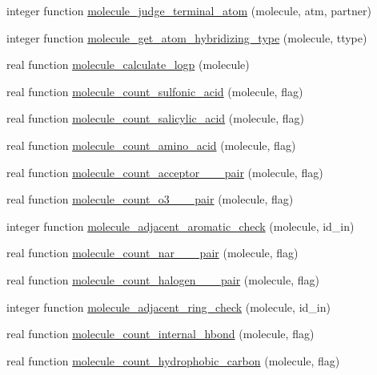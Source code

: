 \begin{DoxyCompactItemize}
\item 
integer function \hyperlink{classcalc__xscore_afcdd1c67bf78c0192ffdc8326f826f41}{molecule\-\_\-judge\-\_\-terminal\-\_\-atom} (molecule, atm, partner)
\item 
integer function \hyperlink{classcalc__xscore_a2519395561372b91576ddc91f217ea0a}{molecule\-\_\-get\-\_\-atom\-\_\-hybridizing\-\_\-type} (molecule, ttype)
\item 
real function \hyperlink{classcalc__xscore_a1468c0b615c6c387ceebe6e51cd9eb14}{molecule\-\_\-calculate\-\_\-logp} (molecule)
\item 
real function \hyperlink{classcalc__xscore_a954cd752fdcc2de9900ee6fe9320fd24}{molecule\-\_\-count\-\_\-sulfonic\-\_\-acid} (molecule, flag)
\item 
real function \hyperlink{classcalc__xscore_a14a42045b9ce5634ef0b1cef1b636446}{molecule\-\_\-count\-\_\-salicylic\-\_\-acid} (molecule, flag)
\item 
real function \hyperlink{classcalc__xscore_a8eb15eed03c9934cc9d4ecf5431d6847}{molecule\-\_\-count\-\_\-amino\-\_\-acid} (molecule, flag)
\item 
real function \hyperlink{classcalc__xscore_a08840b98536e64a66de71d5e9d58ade3}{molecule\-\_\-count\-\_\-acceptor\-\_\-\_\-\_\-pair} (molecule, flag)
\item 
real function \hyperlink{classcalc__xscore_aba6a92c17890123962a56df100de88ec}{molecule\-\_\-count\-\_\-o3\-\_\-\_\-\_\-pair} (molecule, flag)
\item 
integer function \hyperlink{classcalc__xscore_a08c6df8abcb70d7a45472bca83a84a21}{molecule\-\_\-adjacent\-\_\-aromatic\-\_\-check} (molecule, id\-\_\-in)
\item 
real function \hyperlink{classcalc__xscore_a8131c8f084c45175e8f017f9868792ff}{molecule\-\_\-count\-\_\-nar\-\_\-\_\-\_\-pair} (molecule, flag)
\item 
real function \hyperlink{classcalc__xscore_acc319a77251b529f21c43618b4d878ad}{molecule\-\_\-count\-\_\-halogen\-\_\-\_\-\_\-pair} (molecule, flag)
\item 
integer function \hyperlink{classcalc__xscore_a72197541b9f932425601e90275cd9c47}{molecule\-\_\-adjacent\-\_\-ring\-\_\-check} (molecule, id\-\_\-in)
\item 
real function \hyperlink{classcalc__xscore_aced60bf64a0d158b73beb8d2caaa034b}{molecule\-\_\-count\-\_\-internal\-\_\-hbond} (molecule, flag)
\item 
real function \hyperlink{classcalc__xscore_a1b500e7f4daaf756ea2c4f3b07dfcf99}{molecule\-\_\-count\-\_\-hydrophobic\-\_\-carbon} (molecule, flag)

\end{DoxyCompactItemize}
